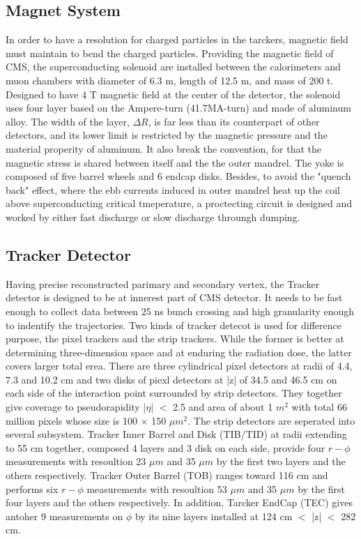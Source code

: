 \subsection{Magnet System} 
In order to have a resolution for charged particles in the tarckers, magnetic field must maintain to bend the charged particles. 
Providing the magnetic field of CMS, the superconducting solenoid are installed between the calorimeters and muon chambers with diameter of 6.3 m, length of 12.5 m, and mass of 200 t. 
Designed to have 4 T magnetic field at the center of the detector, the solenoid uses four layer based on the Ampere-turn (41.7MA-turn) and made of aluminum alloy.
The width of the layer, $\Delta R$, is far less than its counterpart of other detectors, and its lower limit is restricted by the magnetic pressure and the material properity of aluminum.
It also break the convention, for that the magnetic stress is shared between itself and the the outer mandrel. 
The yoke is composed of five barrel wheels and 6 endcap disks. 
Besides, to avoid the "quench back" effect, where the ebb currents induced in outer mandrel heat up the coil above superconducting critical tmeperature, 
a proctecting circuit is designed and worked by either fast discharge or slow discharge throungh dumping. 

\subsection{Tracker Detector} 
Having precise reconstructed parimary and secondary vertex, the Tracker detector is designed to be at innerest part of CMS detector.
It needs to be fast enough to collect data between 25 ns bunch crossing and high granularity enough to indentify the trajectories. 
Two kinds of tracker detecot is used for difference purpose, the pixel trackers and the strip trackers. 
While the former is better at determining three-dimension space and at enduring the radiation dose, 
the latter covers larger total erea. 
There are three cylindrical pixel detectors at radii of 4.4, 7.3 and 10.2 cm and two disks of piexl detectors at |z| of 34.5 and 46.5 cm on each side of the interaction point surrounded by strip detectors.
They together give coverage to pseudorapidity |$\eta $| $<$ 2.5 and area of about 1 $m^2$ with total 66 million pixels whose size is 100 $\times$ 150 $\mu m^2$. 
The strip detectors are seperated into several subsystem. Tracker Inner Barrel and Disk (TIB/TID) at radii extending to 55 cm together, composed 4 layers and 3 disk on each side, 
provide four $r-\phi $ measurements with resoultion 23 $\mu m$ and 35 $\mu m$ by the first two layers and the others respectively. 
Tracker Outer Barrel (TOB) ranges toward 116 cm and performs six $r-\phi $ measurements with resoultion 53 $\mu m$ and 35 $\mu m$ by the first four layers and the others respectively.
In addition, Tarcker EndCap (TEC) gives antoher 9 measurements on $\phi $ by its nine layers installed at 124 cm $<$ |z| $<$ 282 cm.
 
